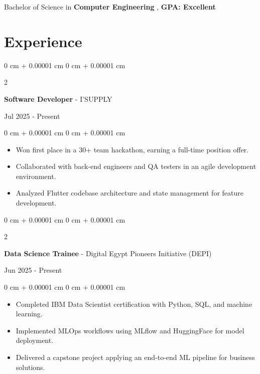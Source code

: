 \documentclass[10pt, letterpaper]{article}
\newenvironment{highlights}{
\begin{itemize}[
topsep=0.10 cm,
parsep=0.10 cm,
partopsep=0pt,
itemsep=0pt,
leftmargin=0 cm + 10pt
]
}{
\end{itemize}
} %
\newenvironment{onecolentry}{
\begin{adjustwidth}{
0 cm + 0.00001 cm
}{
0 cm + 0.00001 cm
}
}{
\end{adjustwidth}
} %
\newenvironment{twocolentry}[2][]{
\onecolentry
\def\secondColumn{#2}
\setcolumnwidth{\fill, 4.5 cm}
\begin{paracol}{2}
}{
\switchcolumn \raggedleft \secondColumn
\end{paracol}
\endonecolentry
} %
\begin{document}
\vspace{0.10cm}

Bachelor of Science in \textbf{Computer Engineering} , \textbf{GPA: Excellent}




\section{Experience}
\vspace{0.2cm}
 \begin{samepage}
\begin{twocolentry}{
Jul 2025 - Present}
\textbf{\large Software Developer} - I'SUPPLY
\end{twocolentry}
\vspace{0.1 cm}

\begin{onecolentry}
\begin{highlights}
\item Won first place in a 30+ team hackathon, earning a full-time position offer.
\item Collaborated with back-end engineers and QA testers in an agile development environment.
\item Analyzed Flutter codebase architecture and state management for feature development.
\end{highlights}
\end{onecolentry}
\end{samepage}

\vspace{0.2cm}
\begin{samepage}
\begin{twocolentry}{
Jun 2025 - Present
}
\textbf{\large Data Science Trainee} - Digital Egypt Pioneers Initiative (DEPI)
\end{twocolentry}

\vspace{0.1cm}

\begin{onecolentry}
\begin{highlights}
\item Completed IBM Data Scientist certification with Python, SQL, and machine learning.
\item Implemented MLOps workflows using MLflow and HuggingFace for model deployment.
\item Delivered a capstone project applying an end-to-end ML pipeline for business solutions.
\end{highlights}
\end{onecolentry}
\end{samepage}
\end{document}
